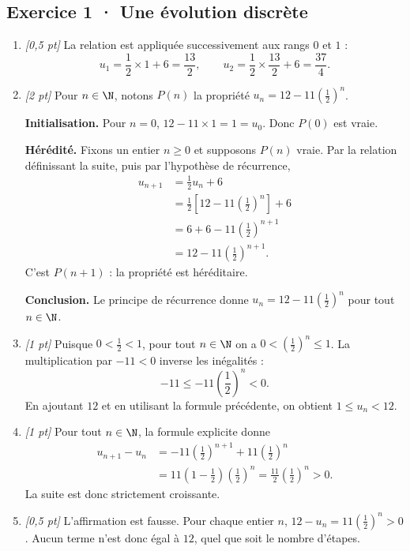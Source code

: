 \subsection*{Exercice 1 · Une évolution discrète}\begin{enumerate}

\item \textit{[0{,}5 pt]} La relation est appliquée successivement aux rangs $0$ et $1$ :\[u_1=\frac{1}{2}\times 1+6=\frac{13}{2},\qquad u_2=\frac{1}{2}\times \frac{13}{2}+6=\frac{37}{4}.\]

\item \textit{[2 pt]} Pour $n\in\N$, notons $P(n)$ la propriété $u_n=12-11\left(\frac{1}{2}\right)^n$.
\par\smallskip\textbf{Initialisation.} Pour $n=0$, $12-11\times1=1=u_0$. Donc $P(0)$ est vraie.
\par\smallskip\textbf{Hérédité.} Fixons un entier $n\ge0$ et supposons $P(n)$ vraie. Par la relation définissant la suite, puis par l'hypothèse de récurrence,
\[\begin{aligned}u_{n+1}&=\frac{1}{2}u_n+6\\
&=\frac{1}{2}\left[12-11\left(\frac{1}{2}\right)^n\right]+6\\
&=6+6-11\left(\frac{1}{2}\right)^{n+1}\\
&=12-11\left(\frac{1}{2}\right)^{n+1}.
\end{aligned}\]
C'est $P(n+1)$ : la propriété est héréditaire.
\par\smallskip\textbf{Conclusion.} Le principe de récurrence donne $u_n=12-11\left(\frac{1}{2}\right)^n$ pour tout $n\in\N$.

\item \textit{[1 pt]} Puisque $0<\frac{1}{2}<1$, pour tout $n\in\N$ on a $0<(\frac{1}{2})^n\le1$. La multiplication par $-11<0$ inverse les inégalités :
\[-11\le-11(\frac{1}{2})^n<0.\]
En ajoutant $12$ et en utilisant la formule précédente, on obtient $1\le u_n<12$.

\item \textit{[1 pt]} Pour tout $n\in\N$, la formule explicite donne
\[\begin{aligned}u_{n+1}-u_n&=-11(\frac{1}{2})^{n+1}+11(\frac{1}{2})^n\\&=11(1-\frac{1}{2})(\frac{1}{2})^n=\frac{11}{2}(\frac{1}{2})^n>0.\end{aligned}\]
La suite est donc strictement croissante.

\item \textit{[0{,}5 pt]} L'affirmation est fausse. Pour chaque entier $n$, $12-u_n=11(\frac{1}{2})^n>0$. Aucun terme n'est donc égal à $12$, quel que soit le nombre d'étapes.

\end{enumerate}


